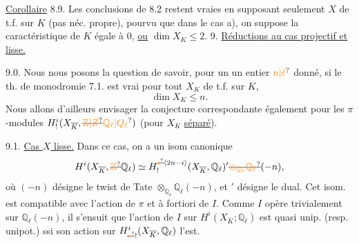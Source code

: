 
\uline{Corollaire} 8.9. Les conclusions de 8.2 restent vraies en supposant seulement $X$ de t.f. sur $K$ (pas néc. propre), pourvu que dans le cas a), on suppose la caractéristique de $K$ égale à $0$, \uline{ou} $\dim X_K\leq2$.
9. \uline{Réductions au cas projectif et lisse.}

9.0. Nous nous posons la question de savoir, pour un  un entier $\unsure{n|\ell}$ donné, si le th. de monodromie 7.1. est vrai pour tout $X_K$ de t.f. sur $K$,  
\[
\dim X_K\leq n.
\]
Nous allons d'ailleurs envisager la conjecture correspondante également pour les $\pi$-modules $H^i_!(X_{\overline K},\deleted{\unsure{\mathbb Z|Z}}\unsure{\mathbb Q_\ell|Q_\ell})$ (pour $X_K$ \uline{séparé}).

9.1. \uline{Cas $X$ lisse.}  Dans ce cas,   on a un isom canonique
\[
H^i(X_{\overline K},\deleted{\unsure{\mathbb Z}}\mathbb Q_\ell)\simeq H^{\deleted{\unsure{i}}\inserted{2n-i}}_!(X_{\overline K},\mathbb Q_\ell)'\deleted{\unsure{\otimes_{\mathbb Q_\ell}\mathbb Q_\ell}}(-n),
\]
où \deleted{$\unsure{\otimes}$} $(-n)$ désigne le twist de Tate $\otimes_{\mathbb Q_\ell}\mathbb Q_\ell(-n)$,  et $'$ désigne le dual. Cet isom. est compatible avec l'action de $\pi$ et à fortiori de $I$. Comme $I$ opère trivialement sur $\mathbb Q_\ell(-n)$, il s'ensuit que l'action de $I$ sur $H^i(X_{\overline K};\mathbb Q_\ell)$ est quasi unip. (resp. unipot.) ssi son action sur $H^i_{\deleted{\unsure{*}}!}(X_{\overline K},\mathbb Q_\ell)$ l'est.

